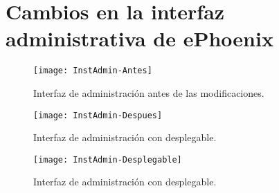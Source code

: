 \chapter{Cambios en la interfaz administrativa de ePhoenix}
\label{apendiceA}


\begin{figure}[h!]
\centering
\texttt{[image: InstAdmin-Antes]}
\caption[Interfaz de administración original]{Interfaz de administración antes de las modificaciones.}
\label{instadmin:original}
\end{figure}

\begin{figure}[h!]
\centering
\texttt{[image: InstAdmin-Despues]}
\caption[Interfaz de administración modificada]{Interfaz de administración con desplegable.}
\label{instadmin:modificado}
\end{figure}

\begin{figure}[h!]
\centering
\texttt{[image: InstAdmin-Desplegable]}
\caption[Interfaz de administración con desplegable]{Interfaz de administración con desplegable.}
\label{instadmin:desplegable}
\end{figure}
